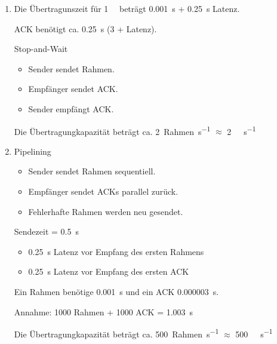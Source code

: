 \documentclass[ngerman]{scrartcl}
\begin{document}
\begin{enumerate}[label=\alph*)]
  \item

  Die Übertragunszeit für \SI{1}{\kilo\bit} beträgt \SI{0,001}{\second} +
  \SI{0,25}{\second} Latenz.

  ACK benötigt ca. \SI{0,25}{\second} (\SI{3}{\bit} + Latenz).

  Stop-and-Wait
  \begin{itemize}
    \item Sender sendet Rahmen.
    \item Empfänger sendet ACK.
    \item Sender empfängt ACK.
  \end{itemize}

  Die Übertragungkapazität beträgt ca. \SI{2}{Rahmen\per\second} $\approx$
  \SI{2}{\kilo\bit\per\second}
  \pagebreak
  \item
  Pipelining
  \begin{itemize}
    \item Sender sendet Rahmen sequentiell.
    \item Empfänger sendet ACKs parallel zurück.
    \item Fehlerhafte Rahmen werden neu gesendet.
  \end{itemize}

  Sendezeit = \SI{0,5}{\second}

  \begin{itemize}
    \item \SI{0,25}{\second} Latenz vor Empfang des ersten Rahmens
    \item \SI{0,25}{\second} Latenz vor Empfang des ersten ACK
  \end{itemize}

  Ein Rahmen benötige \SI{0,001}{\second} und ein ACK \SI{0,000003}{\second}.

  Annahme: 1000 Rahmen + 1000 ACK = \SI{1,003}{\second}

  Die Übertragungkapazität beträgt ca. \SI{500}{Rahmen\per\second} $\approx$
  \SI{500}{\kilo\bit\per\second}
\end{enumerate}
\end{document}
